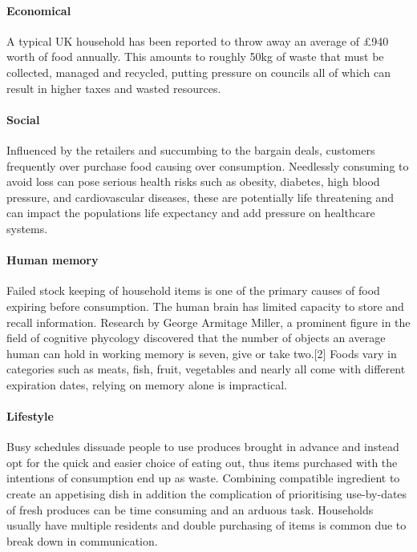 \documentclass[a4paper, 11pt]{article}
\begin{document}
\paragraph{Economical}A typical UK household has been reported to throw away an average of \pounds940 worth of food annually. This amounts to roughly 50kg of waste that must be collected, managed and recycled, putting pressure on councils all of which can result in higher taxes and wasted resources.

\paragraph{Social} Influenced by the retailers and succumbing to the bargain deals, customers frequently over purchase food causing over consumption. Needlessly consuming to avoid loss can pose serious health risks such as obesity, diabetes, high blood pressure, and cardiovascular diseases, these are potentially life threatening and can impact the populations life expectancy and add pressure on healthcare systems. 

\paragraph{Human memory}Failed stock keeping of household items is one of the primary causes of food expiring before consumption. The human brain has limited capacity to store and recall information. Research by George Armitage Miller, a prominent figure in the field of cognitive phycology discovered that the number of objects an average human can hold in working memory is seven, give or take two.[2] Foods vary in categories such as meats, fish, fruit, vegetables and nearly all come with different expiration dates, relying on memory alone is impractical. 

\paragraph{Lifestyle} Busy schedules dissuade people to use produces brought in advance and instead opt for the quick and easier choice of eating out, thus items purchased with the intentions of consumption end up as waste. Combining compatible ingredient to create an appetising dish in addition the complication of prioritising use-by-dates of fresh produces can be time consuming and an arduous task. Households usually have multiple residents and double purchasing of items is common due to break down in communication. 
\end{document}
